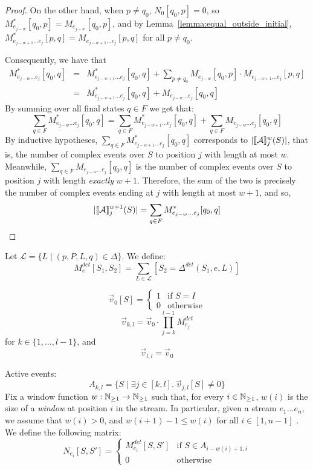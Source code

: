 \begin{proof}
On the other hand, when $p\neq q_0$, $N_0[q_0,p] = 0$, so $M^*_{e_{j-w}}[q_0, p] = M_{e_{j-w}}[q_0, p]$, and by Lemma~\ref{lemma:equal_outside_initial}, $M^*_{e_{j-w + 1}\dots e_j}[p, q] = M_{e_{j-w + 1}\dots e_j}[p, q]$ for all $p\neq q_0$.

Consequently, we have that
$$
\begin{array}{rcl}
   M^*_{e_{j-w}\dots e_j}[q_0,q] & = & M^*_{e_{j-w + 1}\dots e_j}[q_0, q] + \sum_{p\neq q_0} M_{e_{j-w}}[q_0,p] \cdot M_{e_{j-w + 1}\dots e_j}[p, q] \\
   & = &  M^*_{e_{j-w + 1}\dots e_j}[q_0, q] + M_{e_{j-w}\dots e_j}[q_0,q]
\end{array}$$
By summing over all final states $q\in F$ we get that:
$$\sum_{q\in F} M^*_{e_{j-w}\dots e_j}[q_0,q] = \sum_{q\in F}M^*_{e_{j-w + 1}\dots e_j}[q_0, q] + \sum_{q\in F}M_{e_{j-w}\dots e_j}[q_0,q]$$
By inductive hypotheses, $\sum_{q\in F}M^*_{e_{j-w + 1}\dots e_j}[q_0, q]$ corresponds to $|\llbracket\mathcal{A}\rrbracket_{j}^w(S)|$, that is, the number of complex events over $S$ to position $j$ with length at most $w$. 
Meanwhile, $\sum_{q\in F}M_{e_{j-w}\dots e_j}[q_0,q]$ is the number of complex events over $S$ to position $j$ with length \textit{exactly} $w + 1$.
Therefore, the sum of the two is precisely the number of complex events ending at $j$ with length at most $w+1$, and so, 
$$|\llbracket\mathcal{A}\rrbracket_{j}^{w+1}(S)| = \sum_{q\in F} M^*_{e_{j - w}\dots e_j}[q_0,q]$$
\end{proof}


Let $\mathscr{L} = \{L \mid (p,P,L,q)\in\Delta\}$. We define: 
$$M_{e}^{det}[S_1,S_2] =  \sum_{L\in\mathscr{L}} [S_2 = \Delta^{det}(S_1,e,L)] $$

$$\vec{v}_0[S] = \begin{cases}
    1 & \text{if } S = I \\
    0 & \text{otherwise}
\end{cases}$$
$$\vec{v}_{k,l} = \vec{v}_0 \cdot \prod_{j=k}^{l-1} M_{e_j}^{det} $$
for $k \in \{1,\dots,l-1\}$, and
$$\vec{v}_{l,l} = \vec{v}_0$$

Active events:
\[
A_{k,l} = \{S\mid \exists j\in[k,l].\ \vec{v}_{j,l}[S] \neq 0\}
\]
Fix a window function $w: \mathbb{N}_{\geq 1}\rightarrow \mathbb{N}_{\geq 1}$ such that, for every $i \in \mathbb{N}_{\geq 1}$, $w(i)$ is the size of a \emph{window} at position $i$ in the stream. In particular, given a stream $e_1\dots e_n$, we assume that $w(i) > 0$, and $w(i + 1) - 1 \leq w(i)$ for all $i\in[1,n-1]$ . We define the following matrix:
$$N_{e_i}[S,S'] = \begin{cases}
    M_{e_i}^{det}[S, S'] & \text{if } S \in A_{i - w(i)+1,i} \\
    0 & \text{otherwise}
\end{cases}$$

